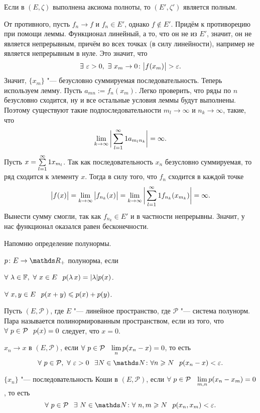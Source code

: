 \begin{The}
  Если в $(E,\zeta)$ выполнена аксиома полноты, то $(E',\zeta')$ является полным.
\end{The}
\begin{Proof}
  От противного, пусть $f_n\to f$ и $f_n\in E'$, однако $f\not\in E'$. Придём к противорецию при помощи леммы. Функционал линейный, а то, что он не из $E'$, значит, он не является непрерывным, причём во всех точках (в силу линейности), например не является непрерывным в нуле. Это значит, что
\[
  \exists\ \e>0,\ \exists\ x_m\to 0\colon \big|f(x_m)\big|>\e.
\]
Значит, $\{x_m\}$ "--- безусловно суммируемая последовательность. Теперь используем лемму. Пусть $a_{mn}:=f_n(x_m)$. Легко проверить, что ряды по $n$ безусловно сходится, ну и все остальные условия леммы будут выполнены. Поэтому существуют такие подпоследовательности $m_l\to\infty$ и $n_k\to\infty$, такие, что 
\[
  \lim\limits_{k\rightarrow\infty}\bigg|\sum\limits_{{l}={1}}^\infty1 a_{m_ln_k}\bigg|=\infty.
\]
Пусть $x = \sum\limits_{{l}={1}}^\infty1 x_{m_l}$. Так как последовательность $x_n$ безусловно суммируемая, то ряд сходится к элементу $x$. Тогда в силу того, что $f_n$ сходится в каждой точке
\[
  \big|f(x)\big| = \lim\limits_{k\rightarrow\infty}\big|f_{n_k}(x)\big| = 
  \lim\limits_{k\rightarrow\infty}\bigg|\sum\limits_{{l}={1}}^\infty1 f_{n_k}(x_{m_k})\bigg| = \infty.
\]
Вынести сумму смогли, так как $f_{n_k}\in E'$ и в частности непрерывны. Значит, у нас функционал оказался равен бесконечности.
\end{Proof}

Напомню определение полунормы.
\begin{Def}
  $p\colon E\to\R_+$ полунорма, если
\begin{roItems}
  \item $\forall\ \l\in\F,\ \forall\ x\in E\pau  p(\lambda\,x) = |\l|p(x)$.
  \item $\forall\ x,y\in E\pau p(x+y)\le p(x)+p(y)$.
\end{roItems}
\end{Def}

\begin{Def}
Пусть $(E,\mathcal P)$, где $E$ "--- линейное пространство, где $\mathcal P$ "--- система полунорм. Пара называется полинормированным пространством, если из того, что $\forall\ p\in\mathcal P\pau p(x)=0$ следует, что $x=0$.
\end{Def}
\begin{Def}
 $x_n\to x$ в $(E,\mathcal P)$, если $\forall\ p\in\mathcal P\pau \lim\limits_n p(x_n-x)=0$, то есть
\[
  \forall\ p\in\mathcal P,\ \forall\ \e>0\pau \exists N\in\N\colon \forall n\ge N\pau p(x_n-x)<\e.
\]
\end{Def}
\begin{Def}
$\{x_n\}$ "--- последовательность Коши в $(E,\mathcal P)$, если $\forall\ p\in\mathcal P\pau \lim\limits_{m,n}p(x_n-x_m)=0$, то есть
\[
  \forall\ p\in\mathcal P\pau \exists\ N\in\N\colon\forall\ n,m\ge N\pau p(x_n,x_m)<\e.
\]
\end{Def}


